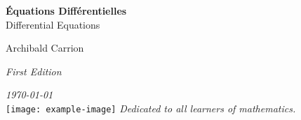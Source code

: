 \documentclass[11pt,a4paper]{book}
\newcommand{\booktitle}{\Huge\textbf{\textcolor{blue!70!black}{Équations Différentielles}}}
\newcommand{\booksubtitle}{\Large Differential Equations}
\newcommand{\authorname}{\Large Archibald Carrion}
\newcommand{\edition}{\normalsize \textit{First Edition}}
\newcommand{\publishdate}{\normalsize \textit{\today}}
\begin{document}
\begin{titlepage}
    \begin{center}
        \vspace*{1cm}
        \booktitle \\
        \vspace{0.5cm}
        \booksubtitle \\
        \vspace{1.5cm}

        \authorname \\
        \vspace{0.5cm}

        \edition \\
        \vspace{0.5cm}

        \publishdate \\
        \vfill
        \texttt{[image: example-image]} %
        \vfill
        \textit{Dedicated to all learners of mathematics.}
    \end{center}
\end{titlepage}

\tableofcontents
\newpage








\end{document}
